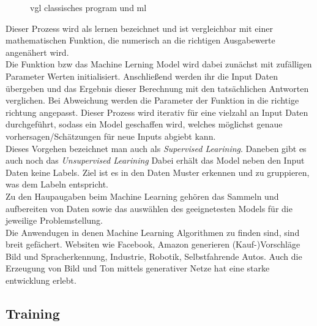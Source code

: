 \begin{figure}[htb]
    \centering
    \begin{minipage}[b]{0.4\textwidth}
        \centering
        
    \end{minipage}
    \begin{minipage}[b]{0.4\textwidth}
        \centering
        
    \end{minipage}
    \caption{vgl classisches program und ml}
    \label{fig:ml_system}
\end{figure}


Dieser Prozess wird als lernen bezeichnet und ist vergleichbar mit einer mathematischen Funktion, die numerisch an die 
richtigen Ausgabewerte angenähert wird.
\\
Die Funktion bzw das Machine Lerning Model wird dabei zunächst mit zufälligen Parameter Werten initialisiert.
Anschließend werden ihr die Input Daten übergeben und das Ergebnis dieser Berechnung mit den tatsächlichen Antworten 
verglichen. Bei Abweichung werden die Parameter der Funktion in die richtige richtung angepasst. 
Dieser Prozess wird iterativ für eine vielzahl an Input Daten durchgeführt, sodass ein Model geschaffen wird, 
welches möglichst genaue vorhersagen/Schätzungen für neue Inputs abgiebt kann.
\\

Dieses Vorgehen bezeichnet man auch als \textit{Supervised Learining}. Daneben gibt es auch noch das \textit{Unsupervised Learining} 
Dabei erhält das Model neben den Input Daten keine Labels. Ziel ist es in den Daten Muster erkennen und zu gruppieren, was dem Labeln
entspricht.
\\
Zu den Haupaugaben beim Machine Learning gehören das Sammeln und aufbereiten von Daten sowie das auswählen des geeignetesten 
Models für die jeweilige Problemstellung.\\


Die Anwendugen in denen Machine Learning Algorithmen zu finden sind, sind breit gefächert.
Websiten wie Facebook, Amazon generieren (Kauf-)Vorschläge Bild und Spracherkennung, Industrie, Robotik, Selbstfahrende Autos.
Auch die Erzeugung von Bild und Ton mittels generativer Netze hat eine starke entwicklung erlebt.\\



\subsection{Training}

